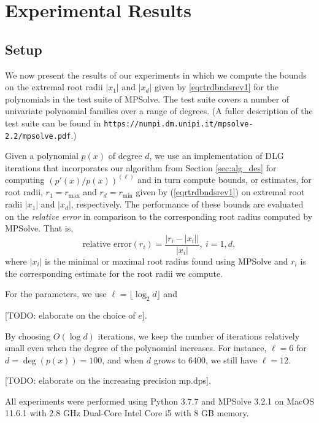 \documentclass[runningheads]{llncs}
\begin{document}
\section{Experimental Results}
\subsection{Setup}
We now present the results of our experiments in which we compute the bounds on the extremal root radii $|x_1|$ and $|x_d|$ given by \ref{eqrtrdbndsrev1} for the polynomials in the test suite of MPSolve. The test suite covers a number of univariate polynomial families over a range of degrees. (A fuller description of the test suite can be found in \texttt{https://numpi.dm.unipi.it/mpsolve-2.2/mpsolve.pdf}.) 

Given a polynomial $p(x)$ of degree $d$, we use an implementation of DLG iterations that incorporates our algorithm from Section \ref{sec:alg_des} for computing $(p'(x)/p(x))^{(\ell)}$ and in turn compute bounds, or estimates, for root radii, $r_1 = r_{\text{max}}$ and $r_d = r_{\text{min}}$ given by (\ref{eqrtrdbndsrev1}) on extremal root radii $|x_1|$ and $|x_d|$, respectively. The performance of these bounds are evaluated on the \emph{relative error} in comparison to the corresponding root radius computed by MPSolve. That is,
$$
\text{relative error}(r_i) = \frac{\big|r_i - |x_i|\big|}{|x_i|},~i = 1, d,
$$
where $|x_i|$ is the minimal or maximal root radius found using MPSolve and $r_i$ is the corresponding estimate for the root radii we compute.

For the parameters, we use $\ell = \lfloor \log_2 d \rfloor$ and 

[TODO: elaborate on the choice of $e$]. 

By choosing $O(\log d)$ iterations, we keep the number of iterations relatively small even when the degree of the polynomial increases. For instance, $\ell = 6$ for $d = \deg(p(x)) = 100$, and when $d$ grows to 6400, we still have $\ell = 12$.

[TODO: elaborate on the increasing precision mp.dps].

All experiments were performed using Python 3.7.7 and MPSolve 3.2.1 on MacOS 11.6.1 with 2.8 GHz Dual-Core Intel Core i5 with 8 GB memory. 
\end{document}
